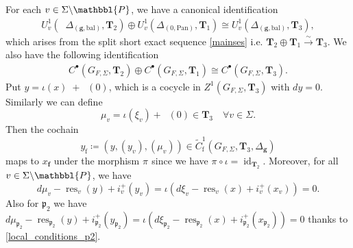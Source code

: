 \documentclass[10pt]{amsart}
\numberwithin{equation}{section}
\theoremstyle{definition}
\theoremstyle{remark} %
\newcommand{\ba}{\backslash}
\newcommand{\pan}{\mathrm{Pan}}
\DeclareMathOperator{\res}{res}
\DeclareMathOperator{\tr}{{tr}^*}
\renewcommand{\b}{\mathrm{bal}}
\newcommand{\f}{\mathbf{f}}
\newcommand{\g}{\mathbf{g}}
\newcommand{\p}{\mathfrak{p}}
\newcommand{\bP}{\mathbbl{P}}
\newcommand{\T}{\mathbf{T}}
\begin{document}
		For each $ v \in \Sigma\ba \bP $, we have a canonical identification 
		\begin{align}
			U^{1}_v(\tr \Delta_{(\g,\b)}, \T_{2}) \oplus U^{1}_v( \Delta_{(0,\pan)}, \T_{1}) \cong U^{1}_v(\Delta_{(\g,\b)}, \T_{3}) ,
		\end{align}
		which arises from the split short exact sequence \eqref{mainses} i.e.
		$ \T_{2} \oplus \T_{1} \xrightarrow{\sim} \T_{3}$. We also have the following identification 
		\begin{align}
			C^{\bullet}(G_{F, \Sigma}, \T_{2}) \oplus C^{\bullet}(G_{F, \Sigma}, \T_{1}) \cong C^{\bullet}(G_{F, \Sigma}, \T_{3}).
		\end{align}
		Put $ y = \iota(x) \; + \tr(0)  $, which is a cocycle in $ Z^1(G_{F,\Sigma}, \T_{3}) $ with $ dy =0 $. Similarly we can define $$ \mu_v = \iota(\xi_v) + \tr(0) \in \T_{3} \quad \forall v \in \Sigma .$$ Then the cochain $$ y_\mathrm{f} \coloneqq (y,(y_v),(\mu_v)) \in \widetilde{C}^1_{\mathrm{f}}\left( G_{F, \Sigma}, \T_{3}, \Delta_{\g}  \right) $$
		maps to $ x_\f $ under the morphism $ \pi_{\tr} $ since we have $ \pi_{\tr} \circ \iota = \operatorname{id}_{\T_{2}} $. Moreover, for all $ v \in \Sigma\backslash\mathbbl{P} $, we have 
		\begin{equation*}
			d\mu_v- \res_{v}(y)+ i_v^{+}(y_v) = \iota (d\xi_v - \res_{v}(x) + i_v^{+}(x_v))=0.
		\end{equation*}
		Also for $ \p_2 $ we have $ d\mu_{\p_2}- \res_{\p_2}(y)+ i_{\p_2}^{+}(y_{\p_2}) = \iota (d\xi_{\p_2} - \res_{\p_2}(x) + i_{\p_2}^{+}(x_{\p_2}))=0 $ thanks to \eqref{local_conditions_p2}.
		
\end{document}
